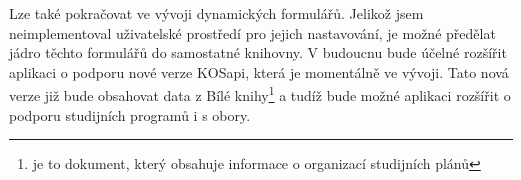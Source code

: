 Lze také pokračovat ve vývoji dynamických formulářů. Jelikož jsem neimplementoval uživatelské prostředí pro jejich nastavování, je možné předělat jádro těchto formulářů do samostatné knihovny. 
V budoucnu bude účelné rozšířit aplikaci o podporu nové verze KOSapi, která je momentálně ve vývoji. Tato nová verze již bude obsahovat data z Bílé knihy\footnote{je to dokument, který obsahuje informace o organizací studijních plánů} a tudíž bude možné aplikaci rozšířit o podporu studijních programů i s obory.

